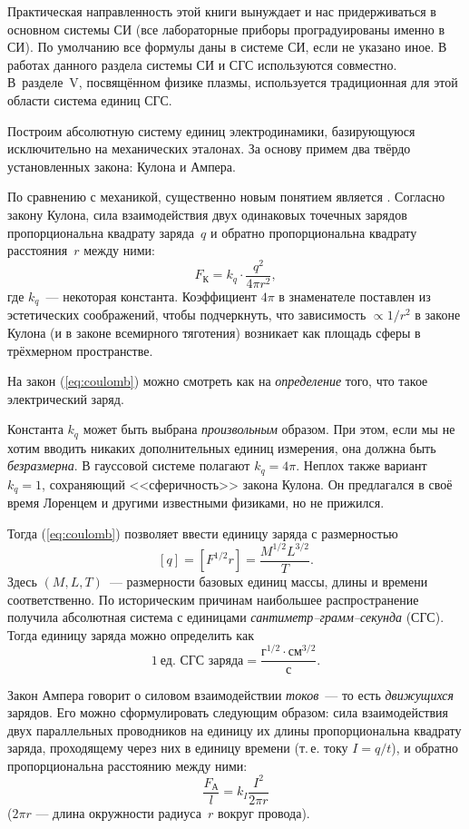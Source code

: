 Практическая направленность этой книги вынуждает и нас придерживаться
в основном системы СИ (все лабораторные приборы проградуированы именно в СИ).
По умолчанию все формулы даны в системе СИ, если не указано иное. 
В работах данного раздела системы СИ и СГС используются совместно. 
В~разделе~V, посвящённом физике плазмы, используется традиционная для 
этой области система единиц СГС.


Построим абсолютную систему единиц электродинамики, базирующуюся исключительно
на механических эталонах. За основу примем два твёрдо установленных
закона: Кулона и Ампера.

По сравнению с механикой, существенно новым понятием является . Согласно закону Кулона, сила взаимодействия двух одинаковых
точечных зарядов пропорциональна квадрату заряда~$q$ и обратно пропорциональна
квадрату расстояния~$r$ между ними:
\begin{equation}
F_{\text{К}}=k_{q}\cdot\frac{q^{2}}{4\pi r^{2}},\label{eq:coulomb}
\end{equation}
где $k_{q}$~--- некоторая константа. Коэффициент $4\pi$ в знаменателе
поставлен из эстетических соображений,
чтобы подчеркнуть, что зависимость $\propto1/r^{2}$ в законе Кулона
(и в законе всемирного тяготения) возникает как площадь сферы в трёхмерном
пространстве.

На закон (\ref{eq:coulomb}) можно смотреть как на \emph{определение}
того, что такое электрический заряд.

Константа $k_{q}$ может быть выбрана \emph{произвольным} образом.
При этом, если мы не хотим вводить никаких дополнительных единиц измерения,
она должна быть \emph{безразмерна}. В гауссовой системе
полагают $k_{q}=4\pi$. Неплох также вариант $k_{q}=1$, сохраняющий
<<сферичность>> закона Кулона. Он предлагался в своё время
Лоренцем и другими известными физиками, но не прижился.

Тогда (\ref{eq:coulomb}) позволяет ввести единицу заряда с размерностью
\[
\left[q\right]=[F^{1/2}r]=\frac{M^{1/2}L^{3/2}}{T}.
\]
Здесь $\left(M,L,T\right)$~--- размерности базовых единиц массы,
длины и времени соответственно. По историческим причинам наибольшее
распространение получила абсолютная система с единицами \emph{сантиметр--грамм--секунда}
(СГС). Тогда единицу заряда можно определить как
\[
1~\text{ед. СГС заряда}=\frac{\text{г}^{1/2}\cdot\text{см}^{3/2}}{\text{с}}.
\]

Закон Ампера говорит о силовом взаимодействии \emph{токов}~--- то
есть \emph{движущихся} зарядов. Его можно сформулировать следующим
образом: сила взаимодействия двух параллельных проводников на единицу их длины
пропорциональна квадрату заряда, проходящему через них в единицу времени
(т.\,е. току $I=q/t$), и обратно пропорциональна расстоянию между ними:
\begin{equation}
\frac{F_{\text{А}}}{l}=k_{I}\frac{I^{2}}{2\pi r}\label{eq:ampere}
\end{equation}
($2\pi r$ --- длина окружности радиуса~$r$ вокруг провода).

